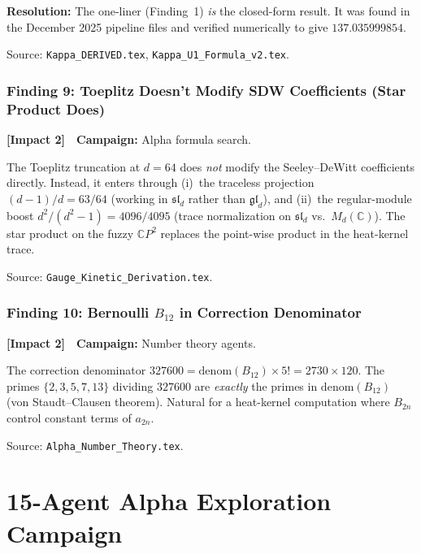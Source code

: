\documentclass[11pt,a4paper]{article}
\newcommand{\impacttwo}{\textcolor{impact2}{\textbf{[Impact 2]}}}
\newcommand{\CP}{\mathbb{C}P}
\begin{document}
\textbf{Resolution:} The one-liner (Finding~1) \emph{is} the closed-form
result. It was found in the December 2025 pipeline files and verified
numerically to give $137.035999854$.

Source: \texttt{Kappa\_DERIVED.tex}, \texttt{Kappa\_U1\_Formula\_v2.tex}.


\section{Finding 9: Toeplitz Doesn't Modify SDW Coefficients (Star Product Does)}
\label{sec:toeplitz}

\impacttwo\ \ \textbf{Campaign:} Alpha formula search.

The Toeplitz truncation at $d = 64$ does \emph{not} modify the
Seeley--DeWitt coefficients directly. Instead, it enters through
(i)~the traceless projection $(d-1)/d = 63/64$ (working in
$\mathfrak{sl}_d$ rather than $\mathfrak{gl}_d$), and
(ii)~the regular-module boost $d^2/(d^2-1) = 4096/4095$ (trace
normalization on $\mathfrak{sl}_d$ vs.\ $M_d(\mathbb{C})$).
The star product on the fuzzy $\CP^2$ replaces the point-wise product
in the heat-kernel trace.

Source: \texttt{Gauge\_Kinetic\_Derivation.tex}.


\section{Finding 10: Bernoulli $B_{12}$ in Correction Denominator}
\label{sec:bernoulli}

\impacttwo\ \ \textbf{Campaign:} Number theory agents.

The correction denominator $327600 = \mathrm{denom}(B_{12}) \times 5!
= 2730 \times 120$. The primes $\{2,3,5,7,13\}$ dividing $327600$ are
\emph{exactly} the primes in $\mathrm{denom}(B_{12})$ (von Staudt--Clausen
theorem). Natural for a heat-kernel computation where $B_{2n}$ control
constant terms of $a_{2n}$.

Source: \texttt{Alpha\_Number\_Theory.tex}.


\part{15-Agent Alpha Exploration Campaign}
\label{part:alpha-exploration}
\end{document}
